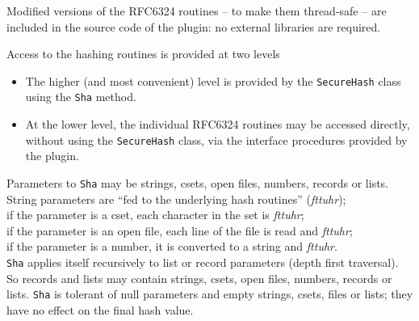 \noindent Modified versions of the RFC6324 routines -- to make them thread-safe
-- are included in the source code of the plugin: no external libraries are
required.

Access to the hashing routines is provided at two levels
\begin{itemize}
  \item The higher (and most convenient) level is provided by the
    \texttt{SecureHash} class using the \texttt{Sha} method.
  \item At the lower level, the individual RFC6324 routines may be accessed
    directly, without using the \texttt{SecureHash} class, via the interface
    procedures provided by the plugin.
\end{itemize}

\noindent
Parameters to \texttt{Sha} may be strings, csets, open files, numbers, records or lists.\\
   String parameters are ``fed to the underlying hash routines'' ({\em fttuhr});\\
   if the parameter is a cset, each character in the set is {\em fttuhr\/};\\
   if the parameter is an open file, each line of the file is read and {\em fttuhr\/};\\
   if the parameter is a number, it is converted to a string and {\em fttuhr\/}.\\
\noindent
\texttt{Sha} applies itself recursively to list or record parameters (depth
first traversal). So records and lists may contain strings, csets, open files,
numbers, records or lists. \texttt{Sha} is tolerant of null parameters and empty
strings, csets, files or lists; they have no effect on the final hash value.

